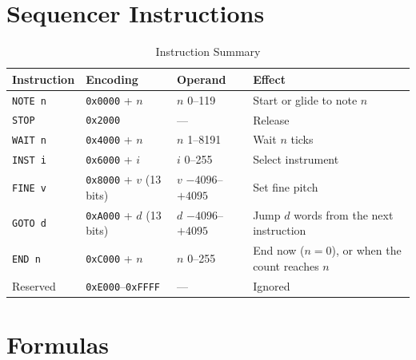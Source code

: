 \section{Sequencer Instructions}

\begin{table}[H]
	\centering
	\small
	\begin{tabular}{llll}
		\toprule
		\textbf{Instruction} & \textbf{Encoding}                & \textbf{Operand}     & \textbf{Effect}                                  \\
		\midrule
		\texttt{NOTE n}      & \texttt{0x0000} + $n$            & $n$ 0--119           & Start or glide to note $n$                       \\
		\texttt{STOP}        & \texttt{0x2000}                  & ---                  & Release                                          \\
		\texttt{WAIT n}      & \texttt{0x4000} + $n$            & $n$ 1--8191          & Wait $n$ ticks                                   \\
		\texttt{INST i}      & \texttt{0x6000} + $i$            & $i$ 0--255           & Select instrument                                \\
		\texttt{FINE v}      & \texttt{0x8000} + $v$ (13 bits)  & $v$ $-4096$--$+4095$ & Set fine pitch                                   \\
		\texttt{GOTO d}      & \texttt{0xA000} + $d$ (13 bits)  & $d$ $-4096$--$+4095$ & Jump $d$ words from the next instruction         \\
		\texttt{END n}       & \texttt{0xC000} + $n$            & $n$ 0--255           & End now ($n = 0$), or when the count reaches $n$ \\
		Reserved             & \texttt{0xE000}--\texttt{0xFFFF} & ---                  & Ignored                                          \\
		\bottomrule
	\end{tabular}
	\caption{Instruction Summary}
	\label{tab:qr-instructions}
\end{table}

\section{Formulas}

